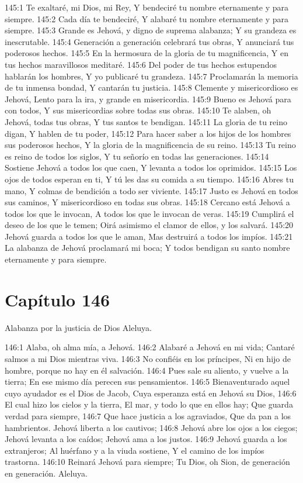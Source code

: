 145:1 Te exaltaré, mi Dios, mi Rey, 
Y bendeciré tu nombre eternamente y para siempre. 
145:2 Cada día te bendeciré, 
Y alabaré tu nombre eternamente y para siempre. 
145:3 Grande es Jehová, y digno de suprema alabanza; 
Y su grandeza es inescrutable. 
145:4 Generación a generación celebrará tus obras, 
Y anunciará tus poderosos hechos. 
145:5 En la hermosura de la gloria de tu magnificencia, 
Y en tus hechos maravillosos meditaré. 
145:6 Del poder de tus hechos estupendos hablarán los hombres, 
Y yo publicaré tu grandeza. 
145:7 Proclamarán la memoria de tu inmensa bondad, 
Y cantarán tu justicia. 
145:8 Clemente y misericordioso es Jehová, 
Lento para la ira, y grande en misericordia. 
145:9 Bueno es Jehová para con todos, 
Y sus misericordias sobre todas sus obras. 
145:10 Te alaben, oh Jehová, todas tus obras, 
Y tus santos te bendigan. 
145:11 La gloria de tu reino digan, 
Y hablen de tu poder, 
145:12 Para hacer saber a los hijos de los hombres sus poderosos hechos, 
Y la gloria de la magnificencia de su reino. 
145:13 Tu reino es reino de todos los siglos, 
Y tu señorío en todas las generaciones. 
145:14 Sostiene Jehová a todos los que caen, 
Y levanta a todos los oprimidos. 
145:15 Los ojos de todos esperan en ti, 
Y tú les das su comida a su tiempo. 
145:16 Abres tu mano, 
Y colmas de bendición a todo ser viviente. 
145:17 Justo es Jehová en todos sus caminos, 
Y misericordioso en todas sus obras. 
145:18 Cercano está Jehová a todos los que le invocan, 
A todos los que le invocan de veras. 
145:19 Cumplirá el deseo de los que le temen; 
Oirá asimismo el clamor de ellos, y los salvará. 
145:20 Jehová guarda a todos los que le aman, 
Mas destruirá a todos los impíos. 
145:21 La alabanza de Jehová proclamará mi boca; 
Y todos bendigan su santo nombre eternamente y para siempre. 
\section*{Capítulo 146}
Alabanza por la justicia de Dios 
Aleluya. 
 
146:1 Alaba, oh alma mía, a Jehová. 
146:2 Alabaré a Jehová en mi vida; 
Cantaré salmos a mi Dios mientras viva. 
146:3 No confiéis en los príncipes, 
Ni en hijo de hombre, porque no hay en él salvación. 
146:4 Pues sale su aliento, y vuelve a la tierra; 
En ese mismo día perecen sus pensamientos. 
146:5 Bienaventurado aquel cuyo ayudador es el Dios de Jacob, 
Cuya esperanza está en Jehová su Dios, 
146:6 El cual hizo los cielos y la tierra, 
El mar, y todo lo que en ellos hay; 
Que guarda verdad para siempre, 
146:7 Que hace justicia a los agraviados, 
Que da pan a los hambrientos. 
Jehová liberta a los cautivos; 
146:8 Jehová abre los ojos a los ciegos; 
Jehová levanta a los caídos; 
Jehová ama a los justos. 
146:9 Jehová guarda a los extranjeros; 
Al huérfano y a la viuda sostiene, 
Y el camino de los impíos trastorna. 
146:10 Reinará Jehová para siempre; 
Tu Dios, oh Sion, de generación en generación. 
Aleluya. 
